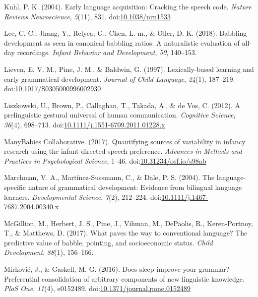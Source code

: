 \documentclass[floatsintext,man]{apa6}
\theoremstyle{definition}
\theoremstyle{definition}
\theoremstyle{definition}
\theoremstyle{remark}
\begin{document}
\hypertarget{ref-kuhl2004early}{}
Kuhl, P. K. (2004). Early language acquisition: Cracking the speech
code. \emph{Nature Reviews Neuroscience}, \emph{5}(11), 831.
doi:\href{https://doi.org/10.1038/nrn1533}{10.1038/nrn1533}

\hypertarget{ref-lee2018babbling}{}
Lee, C.-C., Jhang, Y., Relyea, G., Chen, L.-m., \& Oller, D. K. (2018).
Babbling development as seen in canonical babbling ratios: A
naturalistic evaluation of all-day recordings. \emph{Infant Behavior and
Development}, \emph{50}, 140--153.

\hypertarget{ref-lieven1997lexically}{}
Lieven, E. V. M., Pine, J. M., \& Baldwin, G. (1997). Lexically-based
learning and early grammatical development. \emph{Journal of Child
Language}, \emph{24}(1), 187--219.
doi:\href{https://doi.org/10.1017/S0305000996002930}{10.1017/S0305000996002930}

\hypertarget{ref-liszkowski2012prelinguistic}{}
Liszkowski, U., Brown, P., Callaghan, T., Takada, A., \& de Vos, C.
(2012). A prelinguistic gestural universal of human communication.
\emph{Cognitive Science}, \emph{36}(4), 698--713.
doi:\href{https://doi.org/10.1111/j.1551-6709.2011.01228.x}{10.1111/j.1551-6709.2011.01228.x}

\hypertarget{ref-manybabies2017}{}
ManyBabies Collaborative. (2017). Quantifying sources of variability in
infancy research using the infant-directed speech preference.
\emph{Advances in Methods and Practices in Psychological Science},
1--46.
doi:\href{https://doi.org/10.31234/osf.io/s98ab}{10.31234/osf.io/s98ab}

\hypertarget{ref-marchman2004language}{}
Marchman, V. A., Martínez-Sussmann, C., \& Dale, P. S. (2004). The
language-specific nature of grammatical development: Evidence from
bilingual language learners. \emph{Developmental Science}, \emph{7}(2),
212--224.
doi:\href{https://doi.org/10.1111/j.1467-7687.2004.00340.x}{10.1111/j.1467-7687.2004.00340.x}

\hypertarget{ref-mcgillion2017paves}{}
McGillion, M., Herbert, J. S., Pine, J., Vihman, M., DePaolis, R.,
Keren-Portnoy, T., \& Matthews, D. (2017). What paves the way to
conventional language? The predictive value of babble, pointing, and
socioeconomic status. \emph{Child Development}, \emph{88}(1), 156--166.

\hypertarget{ref-mirkovic2016does}{}
Mirković, J., \& Gaskell, M. G. (2016). Does sleep improve your grammar?
Preferential consolidation of arbitrary components of new linguistic
knowledge. \emph{PloS One}, \emph{11}(4), e0152489.
doi:\href{https://doi.org/10.1371/journal.pone.0152489}{10.1371/journal.pone.0152489}
\end{document}
